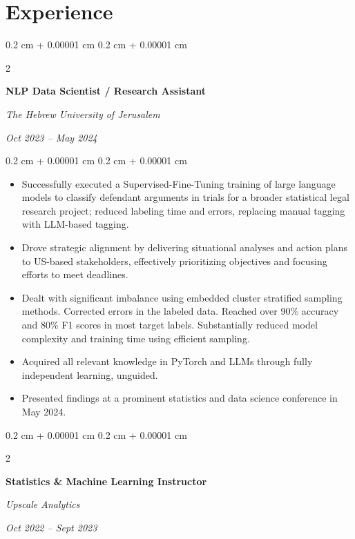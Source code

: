 \documentclass[10pt, letterpaper]{article}
\newenvironment{highlights}{
    \begin{itemize}[
        topsep=0.10 cm,
        parsep=0.10 cm,
        partopsep=0pt,
        itemsep=0pt,
        leftmargin=0.4 cm + 10pt
    ]
}{
    \end{itemize}
} %
\newenvironment{onecolentry}{
    \begin{adjustwidth}{
        0.2 cm + 0.00001 cm
    }{
        0.2 cm + 0.00001 cm
    }
}{
    \end{adjustwidth}
} %
\newenvironment{twocolentry}[2][]{
    \onecolentry
    \def\secondColumn{#2}
    \setcolumnwidth{\fill, 4.5 cm}
    \begin{paracol}{2}
}{
    \switchcolumn \raggedleft \secondColumn
    \end{paracol}
    \endonecolentry
} %
\begin{document}
    \section{Experience}



        
        \begin{twocolentry}{
            
            
        \textit{Oct 2023 – May 2024}}
            \textbf{NLP Data Scientist / Research Assistant}
            
            \textit{The Hebrew University of Jerusalem}
        \end{twocolentry}

        \vspace{0.10 cm}
        \begin{onecolentry}
            \begin{highlights}
                \item Successfully executed a Supervised-Fine-Tuning training of large language models to classify defendant arguments in trials for a broader statistical legal research project; reduced labeling time and errors, replacing manual tagging with LLM-based tagging.
                \item Drove strategic alignment by delivering situational analyses and action plans to US-based stakeholders, effectively prioritizing objectives and focusing efforts to meet deadlines.
                \item Dealt with significant imbalance using embedded cluster stratified sampling methods. Corrected errors in the labeled data. Reached over 90\% accuracy and 80\% F1 scores in most target labels. Substantially reduced model complexity and training time using efficient sampling.
                \item Acquired all relevant knowledge in PyTorch and LLMs through fully independent learning, unguided.
                \item Presented findings at a prominent statistics and data science conference in May 2024.
            \end{highlights}
        \end{onecolentry}


        \vspace{0.2 cm}

        \begin{twocolentry}{
            
            
        \textit{Oct 2022 – Sept 2023}}
            \textbf{Statistics \& Machine Learning Instructor}
            
            \textit{Upscale Analytics}
        \end{twocolentry}
\end{document}

